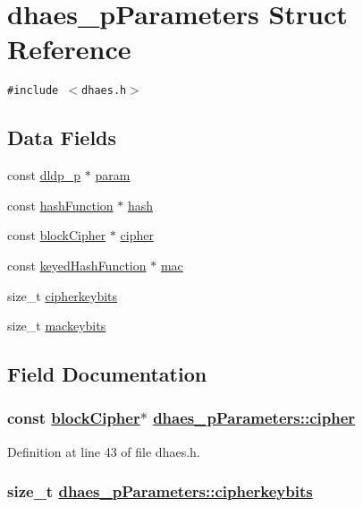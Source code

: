 \hypertarget{structdhaes__pParameters}{
\section{dhaes\_\-p\-Parameters Struct Reference}
\label{structdhaes__pParameters}
}
{\tt \#include $<$dhaes.h$>$}

\subsection*{Data Fields}
\begin{CompactItemize}
\item 
const \hyperlink{structdldp__p}{dldp\_\-p} $\ast$ \hyperlink{structdhaes__pParameters_o0}{param}
\item 
const \hyperlink{structhashFunction}{hash\-Function} $\ast$ \hyperlink{structdhaes__pParameters_o1}{hash}
\item 
const \hyperlink{structblockCipher}{block\-Cipher} $\ast$ \hyperlink{structdhaes__pParameters_o2}{cipher}
\item 
const \hyperlink{structkeyedHashFunction}{keyed\-Hash\-Function} $\ast$ \hyperlink{structdhaes__pParameters_o3}{mac}
\item 
size\_\-t \hyperlink{structdhaes__pParameters_o4}{cipherkeybits}
\item 
size\_\-t \hyperlink{structdhaes__pParameters_o5}{mackeybits}
\end{CompactItemize}


\subsection{Field Documentation}
\hypertarget{structdhaes__pParameters_o2}{
\subsubsection[cipher]{\setlength{\rightskip}{0pt plus 5cm}const \hyperlink{structblockCipher}{block\-Cipher}$\ast$ \hyperlink{structdhaes__pParameters_o2}{dhaes\_\-p\-Parameters::cipher}}}
\label{structdhaes__pParameters_o2}


Definition at line 43 of file dhaes.h.\hypertarget{structdhaes__pParameters_o4}{
\subsubsection[cipherkeybits]{\setlength{\rightskip}{0pt plus 5cm}size\_\-t \hyperlink{structdhaes__pParameters_o4}{dhaes\_\-p\-Parameters::cipherkeybits}}}
\label{structdhaes__pParameters_o4}


